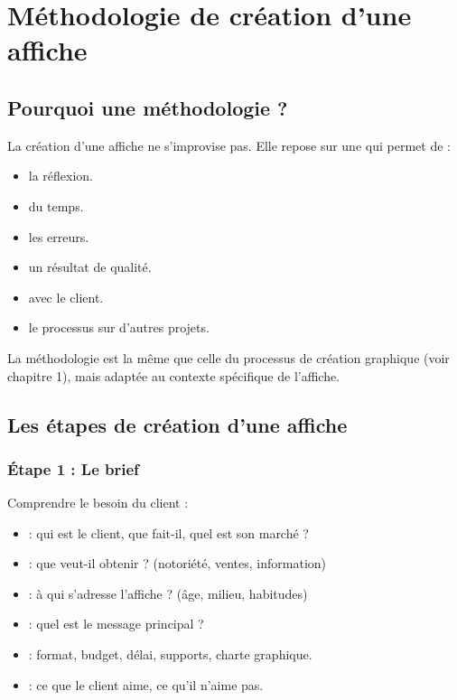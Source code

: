 \section{Méthodologie de création d'une affiche}

\subsection{Pourquoi une méthodologie ?}

La création d'une affiche ne s'improvise pas. Elle repose sur une  qui permet de :

\begin{itemize}
    \item {} la réflexion.
    \item {} du temps.
    \item {} les erreurs.
    \item {} un résultat de qualité.
    \item {} avec le client.
    \item {} le processus sur d'autres projets.
\end{itemize}

La méthodologie est la même que celle du processus de création graphique (voir chapitre 1), mais adaptée au contexte spécifique de l'affiche.

\subsection{Les étapes de création d'une affiche}

\subsubsection{Étape 1 : Le brief}

Comprendre le besoin du client :

\begin{itemize}
    \item {} : qui est le client, que fait-il, quel est son marché ?
    \item {} : que veut-il obtenir ? (notoriété, ventes, information)
    \item {} : à qui s'adresse l'affiche ? (âge, milieu, habitudes)
    \item {} : quel est le message principal ?
    \item {} : format, budget, délai, supports, charte graphique.
    \item {} : ce que le client aime, ce qu'il n'aime pas.
\end{itemize}

